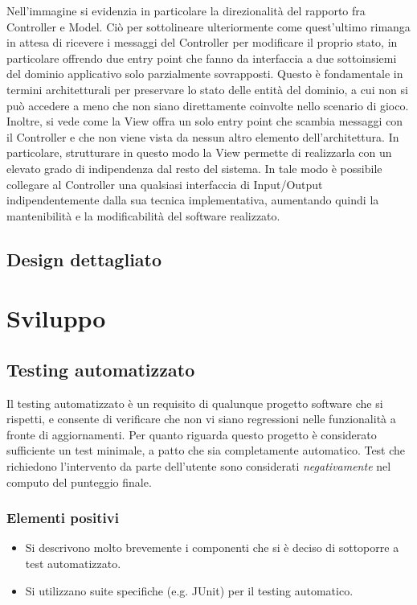 \documentclass[a4paper,12pt]{report}
\begin{document}
Nell'immagine si evidenzia in particolare la direzionalità del rapporto fra Controller e Model. Ciò per sottolineare
ulteriormente come quest'ultimo rimanga in attesa di ricevere i messaggi del Controller per modificare il proprio stato,
in particolare offrendo due entry point che fanno da interfaccia a due sottoinsiemi del dominio applicativo
solo parzialmente sovrapposti. Questo è fondamentale in termini architetturali per preservare lo stato delle entità
del dominio, a cui non si può accedere a meno che non siano direttamente coinvolte nello scenario di gioco.
\newline Inoltre, si vede come la View offra un solo entry point che scambia messaggi con il Controller e che non viene
vista da nessun altro elemento dell'architettura. In particolare, strutturare in questo modo la View permette di
realizzarla con un elevato grado di indipendenza dal resto del sistema. In tale modo è possibile collegare al Controller
una qualsiasi interfaccia di Input/Output indipendentemente dalla sua tecnica implementativa, aumentando quindi
la mantenibilità e la modificabilità del software realizzato. 

\section{Design dettagliato}



\chapter{Sviluppo}
\section{Testing automatizzato}

Il testing automatizzato è un requisito di qualunque progetto software che si rispetti, e consente di verificare che non vi siano regressioni nelle funzionalità a fronte di aggiornamenti.
%
Per quanto riguarda questo progetto è considerato sufficiente un test minimale, a patto che sia completamente automatico.
%
Test che richiedono l'intervento da parte dell'utente sono considerati \textit{negativamente} nel computo del punteggio finale.

\subsection*{Elementi positivi}

\begin{itemize}
 \item Si descrivono molto brevemente i componenti che si è deciso di sottoporre a test automatizzato.
 \item Si utilizzano suite specifiche (e.g. JUnit) per il testing automatico.
\end{itemize}
\end{document}
